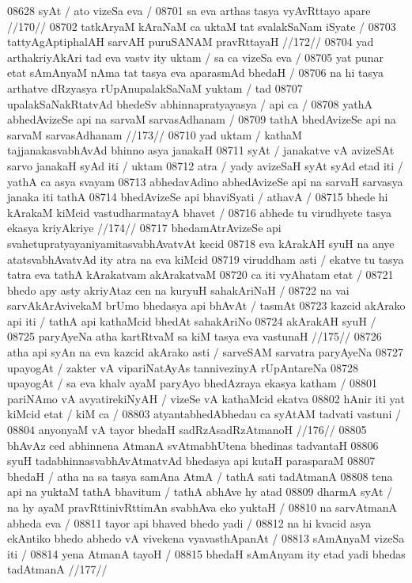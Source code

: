 08628 syAt / ato vizeSa eva /  
08701 	sa eva arthas tasya vyAvRttayo apare //170//
08702 	tatkAryaM kAraNaM ca uktaM tat svalakSaNam iSyate /
08703 	tattyAgAptiphalAH sarvAH puruSANAM pravRttayaH //172//  
08704 yad arthakriyAkAri tad eva vastv ity uktam / sa ca vizeSa eva /
08705 yat punar etat sAmAnyaM nAma tat tasya eva aparasmAd bhedaH /
08706 na hi tasya arthatve dRzyasya rUpAnupalakSaNaM yuktam / tad  
08707 upalakSaNakRtatvAd bhedeSv abhinnapratyayasya / api ca /
08708 	yathA abhedAvizeSe api na sarvaM sarvasAdhanam / 
08709 	tathA bhedAvizeSe api na sarvaM sarvasAdhanam //173//  
08710 yad uktam / kathaM tajjanakasvabhAvAd bhinno asya janakaH 
08711 syAt / janakatve vA avizeSAt sarvo janakaH syAd iti / uktam  
08712 atra / yady avizeSaH syAt syAd etad iti / yathA ca asya svayam
08713 abhedavAdino abhedAvizeSe api na sarvaH sarvasya janaka iti tathA 
08714 bhedAvizeSe api bhaviSyati / athavA /
08715 	bhede hi kArakaM kiMcid vastudharmatayA bhavet /
08716 	abhede tu virudhyete tasya  ekasya kriyAkriye //174// 
08717 bhedamAtrAvizeSe api svahetupratyayaniyamitasvabhAvatvAt kecid  
08718 eva kArakAH syuH na anye atatsvabhAvatvAd ity atra na eva kiMcid  
08719 viruddham asti / ekatve tu tasya tatra eva tathA kArakatvam akArakatvaM
08720 ca iti vyAhatam etat /
08721 	bhedo apy asty akriyAtaz cen na kuryuH sahakAriNaH /
08722 na vai sarvAkArAvivekaM brUmo bhedasya api bhAvAt / tasmAt
08723 kazcid akArako api iti / tathA api kathaMcid bhedAt sahakAriNo  
08724 akArakAH syuH /
08725 	paryAyeNa atha kartRtvaM sa kiM tasya eva vastunaH //175// 
08726 atha api syAn na eva kazcid akArako asti / sarveSAM sarvatra paryAyeNa
08727 upayogAt / zakter vA vipariNatAyAs tannivezinyA rUpAntareNa
08728 upayogAt / sa eva khalv ayaM paryAyo bhedAzraya ekasya katham /
08801 pariNAmo vA avyatirekiNyAH / vizeSe vA kathaMcid ekatva  
08802 hAnir iti yat kiMcid etat / kiM ca / 
08803 	atyantabhedAbhedau ca syAtAM tadvati vastuni /
08804 	anyonyaM vA tayor bhedaH sadRzAsadRzAtmanoH //176//
08805 bhAvAz ced abhinnena AtmanA svAtmabhUtena bhedinas tadvantaH  
08806 syuH tadabhinnasvabhAvAtmatvAd bhedasya api kutaH parasparaM 
08807 bhedaH / atha na sa tasya samAna AtmA / tathA sati tadAtmanA  
08808 tena api na yuktaM tathA bhavitum / tathA abhAve hy atad  
08809 dharmA syAt / na hy ayaM pravRttinivRttimAn svabhAva eko yuktaH / 
08810 na sarvAtmanA abheda eva / 
08811 	tayor api bhaved bhedo yadi /
08812 na hi kvacid asya ekAntiko bhedo abhedo vA vivekena vyavasthApanAt / 
08813 sAmAnyaM vizeSa iti /
08814 	yena AtmanA tayoH /
08815 	bhedaH sAmAnyam ity etad yadi bhedas tadAtmanA //177//  
